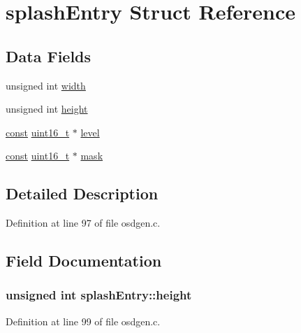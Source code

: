 \hypertarget{structsplash_entry}{\section{splash\-Entry Struct Reference}
\label{structsplash_entry}
}
\subsection*{Data Fields}
\begin{DoxyCompactItemize}
\item 
unsigned int \hyperlink{structsplash_entry_abc2b28627fe7b0fc9344188df68bb455}{width}
\item 
unsigned int \hyperlink{structsplash_entry_a270337b9f05acc774a1297f830c956d7}{height}
\item 
\hyperlink{group___n_a_m_e_ga7ae6d0e43244213b34de2c2b9aa30da6}{const} \hyperlink{stdint_8h_a273cf69d639a59973b6019625df33e30}{uint16\-\_\-t} $\ast$ \hyperlink{structsplash_entry_a6508f6926dabf69e7f04cec57e8f6d21}{level}
\item 
\hyperlink{group___n_a_m_e_ga7ae6d0e43244213b34de2c2b9aa30da6}{const} \hyperlink{stdint_8h_a273cf69d639a59973b6019625df33e30}{uint16\-\_\-t} $\ast$ \hyperlink{structsplash_entry_a0c3001285740dd3a0351be5565bf13d2}{mask}
\end{DoxyCompactItemize}


\subsection{Detailed Description}


Definition at line 97 of file osdgen.\-c.



\subsection{Field Documentation}
\hypertarget{structsplash_entry_a270337b9f05acc774a1297f830c956d7}{
\subsubsection[{height}]{\setlength{\rightskip}{0pt plus 5cm}unsigned int splash\-Entry\-::height}}\label{structsplash_entry_a270337b9f05acc774a1297f830c956d7}


Definition at line 99 of file osdgen.\-c.


